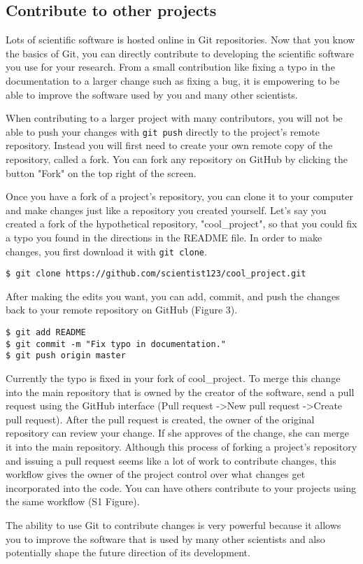 \subsection{Contribute to other projects}

Lots of scientific software is hosted online in Git repositories.
Now that you know the basics of Git, you can directly contribute to developing the scientific software you use for your research.
From a small contribution like fixing a typo in the documentation to a larger change such as fixing a bug, it is empowering to be able to improve the software used by you and many other scientists.

When contributing to a larger project with many contributors, you will not be able to push your changes with \verb|git push| directly to the project's remote repository.
Instead you will first need to create your own remote copy of the repository, called a fork.
You can fork any repository on GitHub by clicking the button "Fork" on the top right of the screen.

Once you have a fork of a project's repository, you can clone it to your computer and make changes just like a repository you created yourself.
Let's say you created a fork of the hypothetical repository, "cool\_project", so that you could fix a typo you found in the directions in the README file.
In order to make changes, you first download it with \verb|git clone|.

\begin{lstlisting}
$ git clone https://github.com/scientist123/cool_project.git
\end{lstlisting}

After making the edits you want, you can add, commit, and push the changes back to your remote repository on GitHub (Figure 3).

\begin{lstlisting}
$ git add README
$ git commit -m "Fix typo in documentation."
$ git push origin master
\end{lstlisting}

Currently the typo is fixed in your fork of cool\_project.
To merge this change into the main repository that is owned by the creator of the software, send a pull request using the GitHub interface (Pull request -\textgreater New pull request -\textgreater Create pull request).
After the pull request is created, the owner of the original repository can review your change.
If she approves of the change, she can merge it into the main repository.
Although this process of forking a project’s repository and issuing a pull request seems like a lot of work to contribute changes, this workflow gives the owner of the project control over what changes get incorporated into the code. You can have others contribute to your projects using the same workflow (S1 Figure). 

The ability to use Git to contribute changes is very powerful because it allows you to improve the software that is used by many other scientists and also potentially shape the future direction of its development.
